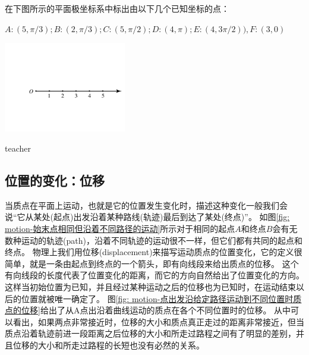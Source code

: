 \begin{example}
在下图所示的平面极坐标系中标出由以下几个已知坐标的点：

$A: (5, \pi/3); B: (2, \pi/3);  C:(5, \pi/2); D:(4, \pi); E: (4, 3\pi/2)), F: (3,0)$
\begin{center}
\includegraphics[width=0.4\textwidth]{images/motion-problem-8.pdf}
\end{center}
\begin{taggedblock}{teacher}


\end{taggedblock}
\end{example}

\subsection{位置的变化：位移}
当质点在平面上运动，也就是它的位置发生变化时，描述这种变化一般我们会说“它从某处(起点)出发沿着某种路线(轨迹)最后到达了某处(终点)”。
如图\ref{fig: motion-始末点相同但沿着不同路径的运动}所示对于相同的起点$A$和终点$B$会有无数种运动的轨迹(path)，沿着不同轨迹的运动很不一样，但它们都有共同的起点和终点。
物理上我们用{\heiti 位移(displacement)}来描写运动质点的位置变化，它的定义很简单，就是一条由起点到终点的一个箭头，即有向线段来给出质点的位移。
这个有向线段的长度代表了位置变化的距离，而它的方向自然给出了位置变化的方向。
这样当初始位置为已知，并且经过某种运动之后的位移也为已知时，在运动结束以后的位置就被唯一确定了。
图\ref{fig: motion-点出发沿给定路径运动到不同位置时质点的位移}给出了从A点出沿着曲线运动的质点在各个不同位置时的位移。
从中可以看出，如果两点非常接近时，位移的大小和质点真正走过的距离非常接近，但当质点沿着轨迹前进一段距离之后位移的大小和所走过路程之间有了明显的差别，并且位移的大小和所走过路程的长短也没有必然的关系。


